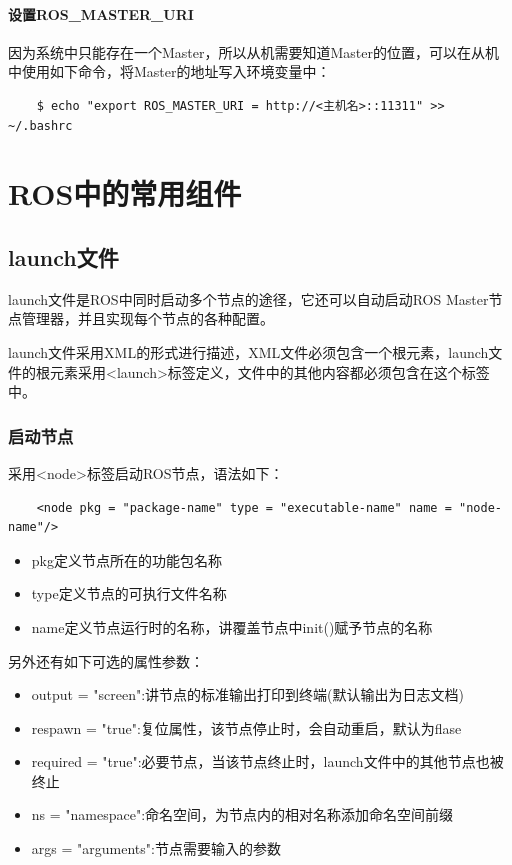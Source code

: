 \documentclass[9pt, oneside]{book}
\begin{document}
\subsubsection{设置ROS\_MASTER\_URI}

因为系统中只能存在一个Master，所以从机需要知道Master的位置，可以在从机中使用如下命令，将Master的地址写入环境变量中：

\begin{verbatim}
    $ echo "export ROS_MASTER_URI = http://<主机名>::11311" >> ~/.bashrc
\end{verbatim}

\chapter{ROS中的常用组件}

\section{launch文件}

launch文件是ROS中同时启动多个节点的途径，它还可以自动启动ROS Master节点管理器，并且实现每个节点的各种配置。

launch文件采用XML的形式进行描述，XML文件必须包含一个根元素，launch文件的根元素采用<launch>标签定义，文件中的其他内容都必须包含在这个标签中。

\subsection{启动节点}

采用<node>标签启动ROS节点，语法如下：

\begin{verbatim}
    <node pkg = "package-name" type = "executable-name" name = "node-name"/>
\end{verbatim}

\begin{itemize}
    \item pkg定义节点所在的功能包名称
    \item type定义节点的可执行文件名称
    \item name定义节点运行时的名称，讲覆盖节点中init()赋予节点的名称
\end{itemize}

另外还有如下可选的属性参数：

\begin{itemize}
    \item output = "screen":讲节点的标准输出打印到终端(默认输出为日志文档)
    \item respawn = "true":复位属性，该节点停止时，会自动重启，默认为flase
    \item required = "true":必要节点，当该节点终止时，launch文件中的其他节点也被终止
    \item ns = "namespace":命名空间，为节点内的相对名称添加命名空间前缀
    \item args = "arguments":节点需要输入的参数
\end{itemize}
\end{document}
